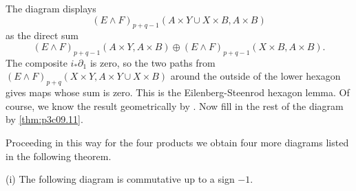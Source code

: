 \documentclass[../main]{subfiles}
\begin{document}
The diagram displays $$(E \wedge F)_{p + q - 1} (A \times Y \cup X \times B, A \times B)$$ as the direct sum $$(E \wedge F)_{p + q - 1} (A \times Y, A \times B) \oplus (E \wedge F)_{p + q - 1} (X \times B, A \times B).$$ The composite $i_\ast \partial_1$ is zero, so the two paths from $(E \wedge F)_{p + q}(X \times Y, A \times Y \cup X \times B)$ around the outside of the lower hexagon gives maps whose sum is zero. This is the Eilenberg-Steenrod hexagon lemma. Of course, we know the result geometrically by . Now fill in the rest of the diagram by \ref{thm:p3c09.11}. 

Proceeding in this way for the four products we obtain four more diagrams listed in the following theorem.

\begin{theorem}\label{thm:p3ch09.12}
\begin{enumerate}(i) The following diagram is commutative up to a sign $-1$.

 {
}


\end{enumerate}
\end{theorem}
\end{document}
